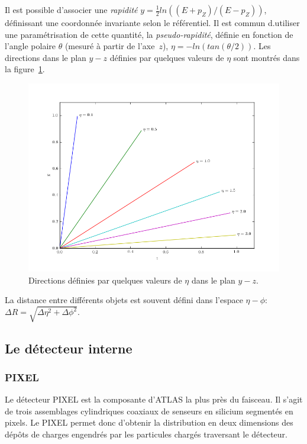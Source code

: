 Il est possible d'associer une \emph{rapidité}
$y = \frac{1}{2}ln((E + p_Z)/(E - p_Z))$, définissant une coordonnée
invariante selon le référentiel. Il est commun d.utiliser une
paramétrisation de cette quantité, la \emph{pseudo-rapidité}, définie
en fonction de l'angle polaire $\theta$ (mesuré à partir de
l'axe~$z$), $\eta = -ln(tan(\theta/2))$. Les directions dans le plan
$y-z$ définies par quelques valeurs de $\eta$ sont montrés dans la
figure~\ref{fig:eta}.

\begin{figure}[h]
  \centering
  \includegraphics[width=.5\textwidth]{eta.png}
  \caption{Directions définies par quelques valeurs de $\eta$ dans le plan $y-z$.}
  \label{fig:eta}
\end{figure}

La distance entre différents objets est souvent défini dans l'espace
$\eta-\phi$: $\Delta R = \sqrt{\Delta\eta^2 + \Delta\phi^2}$.


\subsection{Le détecteur interne}
\label{sec:lhc_atlas:atlas:indet}


\subsubsection{PIXEL}

Le détecteur PIXEL est la composante d'ATLAS la plus près du
faisceau. Il s'agit de trois assemblages cylindriques coaxiaux de
senseurs en silicium segmentés en pixels. Le PIXEL permet donc
d'obtenir la distribution en deux dimensions des dépôts de charges
engendrés par les particules chargés traversant le détecteur.

